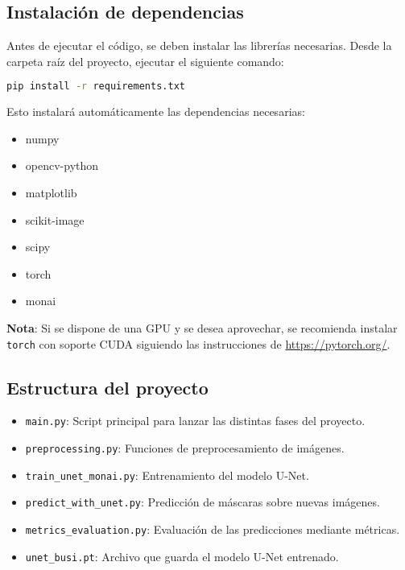 \documentclass[12pt]{article}
\begin{document}
\subsection{Instalación de dependencias}

Antes de ejecutar el código, se deben instalar las librerías necesarias.  
Desde la carpeta raíz del proyecto, ejecutar el siguiente comando:

\begin{lstlisting}[language=bash]
pip install -r requirements.txt
\end{lstlisting}

Esto instalará automáticamente las dependencias necesarias:
\begin{itemize}
    \item numpy
    \item opencv-python
    \item matplotlib
    \item scikit-image
    \item scipy
    \item torch
    \item monai
\end{itemize}

\textbf{Nota}: Si se dispone de una GPU y se desea aprovechar, se recomienda instalar \texttt{torch} con soporte CUDA siguiendo las instrucciones de \url{https://pytorch.org/}.

\subsection{Estructura del proyecto}

\begin{itemize}
    \item \texttt{main.py}: Script principal para lanzar las distintas fases del proyecto.
    \item \texttt{preprocessing.py}: Funciones de preprocesamiento de imágenes.
    \item \texttt{train\_unet\_monai.py}: Entrenamiento del modelo U-Net.
    \item \texttt{predict\_with\_unet.py}: Predicción de máscaras sobre nuevas imágenes.
    \item \texttt{metrics\_evaluation.py}: Evaluación de las predicciones mediante métricas.
    \item \texttt{unet\_busi.pt}: Archivo que guarda el modelo U-Net entrenado.
\end{itemize}
\end{document}
